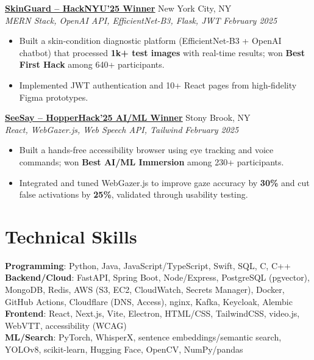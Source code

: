 \documentclass[letterpaper,10pt]{article}
\newcommand{\role}[4]{%
  \textbf{\underline{#1}} \hfill #2\\
  \textit{#3} \hfill \textit{#4}\vspace{-1pt}}
\begin{document}
\role{\href{https://devpost.com/software/skinguard-ai-dermatologist}{SkinGuard -- HackNYU'25 \textbf{Winner}}}{New York City, NY}{MERN Stack, OpenAI API, EfficientNet-B3, Flask, JWT}{February 2025}
\begin{itemize}
  \item Built a skin-condition diagnostic platform (EfficientNet-B3 + OpenAI chatbot) that processed \textbf{1k+ test images} with real-time results; won \textbf{Best First Hack} among 640+ participants.
  \item Implemented JWT authentication and 10+ React pages from high-fidelity Figma prototypes.
\end{itemize}

\role{\href{https://devpost.com/software/seesay-1r8svc}{SeeSay -- HopperHack'25 \textbf{AI/ML Winner}}}{Stony Brook, NY}{React, WebGazer.js, Web Speech API, Tailwind}{February 2025}
\begin{itemize}
  \item Built a hands-free accessibility browser using eye tracking and voice commands; won \textbf{Best AI/ML Immersion} among 230+ participants.
  \item Integrated and tuned WebGazer.js to improve gaze accuracy by \textbf{30\%} and cut false activations by \textbf{25\%}, validated through usability testing.
\end{itemize}

\section{Technical Skills}
\textbf{Programming}: Python, Java, JavaScript/TypeScript, Swift, SQL, C, C++\\
\textbf{Backend/Cloud}: FastAPI, Spring Boot, Node/Express, PostgreSQL (pgvector), MongoDB, Redis, AWS (S3, EC2, CloudWatch, Secrets Manager), Docker, GitHub Actions, Cloudflare (DNS, Access), nginx, Kafka, Keycloak, Alembic\\
\textbf{Frontend}: React, Next.js, Vite, Electron, HTML/CSS, TailwindCSS, video.js, WebVTT, accessibility (WCAG)\\
\textbf{ML/Search}: PyTorch, WhisperX, sentence embeddings/semantic search, YOLOv8, scikit-learn, Hugging Face, OpenCV, NumPy/pandas
\end{document}

